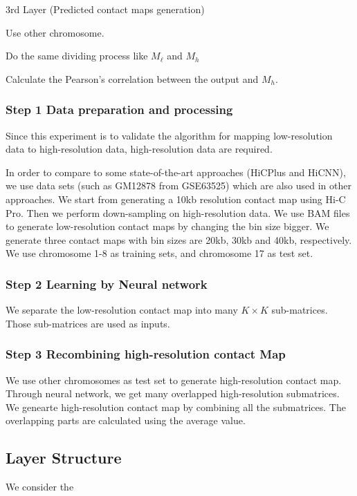 \documentclass{article}
\begin{document}
\noindent 3rd Layer (Predicted contact maps generation)


Use other chromosome. 

Do the same dividing process like $M_\ell$ and $M_h$

Calculate the Pearson's correlation between the output and $M_h$.







\subsubsection*{Step 1 Data preparation and processing}
Since this experiment is to validate the algorithm for mapping low-resolution data to high-resolution data, 
high-resolution data are required. 

In order to compare to some state-of-the-art approaches (HiCPlus and HiCNN), 
we use data sets (such as GM12878 from GSE63525) which are also used in other approaches. 
We start from generating a 10kb resolution contact map 
using Hi-C Pro. 
Then we perform down-sampling on high-resolution data. 
We use BAM files to generate low-resolution contact maps by changing the bin size bigger. 
We generate three contact maps with bin sizes are 20kb, 30kb and 40kb, respectively. 
We use chromosome 1-8 as training sets, and chromosome 17 as test set.

\subsubsection*{Step 2 Learning by Neural network}
We separate the low-resolution contact map into many $K \times K$ sub-matrices. 
Those sub-matrices are used as inputs.


\subsubsection*{Step 3 Recombining high-resolution contact Map}
We use other chromosomes as test set to generate high-resolution contact map. Through neural network, we get many overlapped high-resolution submatrices. We genearte high-resolution contact map by combining all the submatrices. The overlapping parts are calculated using the average value.

\subsection{Layer Structure}
We consider the 





 
\end{document}
